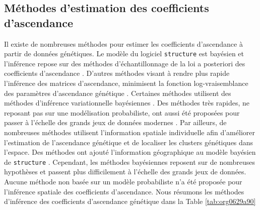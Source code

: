 \documentclass[12pt,a4paper,twoside]{ugathesis}
\begin{document}
\subsection{Méthodes d'estimation des coefficients d'ascendance}
\label{sec:orgb25d705}

Il existe de nombreuses méthodes pour estimer les coefficients d'ascendance à
partir de données génétiques. Le modèle du logiciel \texttt{structure} est bayésien et
l'inférence repose sur des méthodes d'échantillonnage de la loi a posteriori des
coefficients d'ascendance \citep{Pritchard2000}. D'autres méthodes visant à rendre
plus rapide l'inférence des matrices d'ascendance, minimisent la fonction
log-vraisemblance des paramètres d'ascendance génétique
\citep{Tang_2005,alexander2009admixture}. Certaines méthodes utilisent des
méthodes d'inférence variationnelle bayésiennes \citep{Raj_2014}. Des méthodes
très rapides, ne reposant pas sur une modélisation probabiliste, ont aussi été
proposées pour passer à l'échelle des grands jeux de données modernes
\citep{Frichot_2014,Popescu_2014}. Par ailleurs, de nombreuses méthodes utilisent
l'information spatiale individuelle afin d'améliorer l'estimation de
l'ascendance génétique et de localiser les clusters génétiques dans l'espace.
Des méthodes ont ajouté l'information géographique au modèle bayésien de
\texttt{structure} \citep{CHEN_2007,Corander2008,GUEDJ_2011}. Cependant, les méthodes
bayésiennes reposent sur de nombreuses hypothèses et passent plus difficilement
à l'échelle des grands jeux de données. Aucune méthode non basée sur un modèle
probabiliste n'a été proposée pour l'inférence spatiale des coefficients
d'ascendance. Nous résumons les méthodes d'inférence des coefficients
d'ascendance génétique dans la Table \ref{tab:org0629a90}
\end{document}
